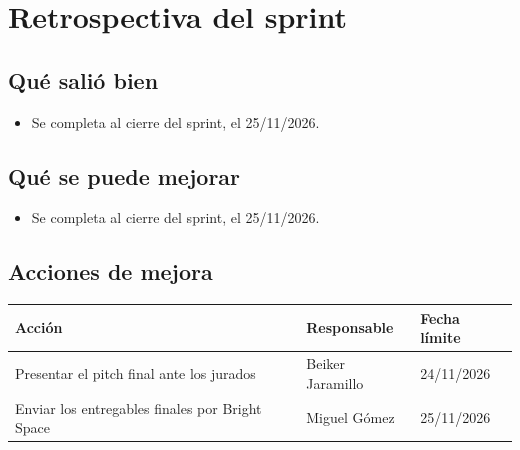 \documentclass[11pt,a4paper]{article}
\begin{document}
\section{Retrospectiva del sprint}

\subsection{Qué salió bien}
\begin{itemize}[leftmargin=1.5em]
  \item {Se completa al cierre del sprint, el 25/11/2026.}
\end{itemize}

\subsection{Qué se puede mejorar}
\begin{itemize}[leftmargin=1.5em]
  \item {Se completa al cierre del sprint, el 25/11/2026.}
\end{itemize}

\subsection{Acciones de mejora}
\begin{tabularx}{\textwidth}{X l l}
  \toprule
  \textbf{Acción} & \textbf{Responsable} & \textbf{Fecha límite} \\
  \midrule
  Presentar el pitch final ante los jurados & Beiker Jaramillo & 24/11/2026 \\
  Enviar los entregables finales por Bright Space & Miguel Gómez & 25/11/2026 \\
  \bottomrule
\end{tabularx}
\end{document}
